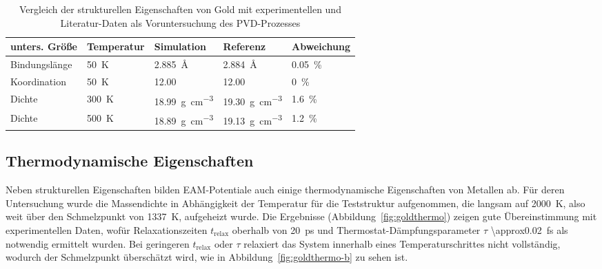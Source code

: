 \begin{table}
  \oddrowcolors
  \caption[Vergleich struktureller Eigenschaften von Gold]{
    Vergleich der strukturellen Eigenschaften von Gold mit experimentellen und Literatur-Daten als Voruntersuchung des PVD-Prozesses
  }
  \label{tab:goldpreresults}
  \begin{tabularx}{\textwidth}{|lXXXX|}
    \hline
    \textbf{unters. Größe} & \textbf{Temperatur} & \textbf{Simulation}                     & \textbf{Referenz}                       & \textbf{Abweichung} \\
    \hline
    Bindungslänge          & \SI{50}{\kelvin}    & \SI{2.885}{\angstrom}                   & \SI{2.884}{\angstrom}                   & \SI{0.05}{\percent} \\
    Koordination           & \SI{50}{\kelvin}    & \SI{12.00}{}                            & \SI{12.00}{}                            & \SI{0}{\percent}    \\
    Dichte                 & \SI{300}{\kelvin}   & \SI{18.99}{\gram\per\cubic\centi\meter} & \SI{19.30}{\gram\per\cubic\centi\meter} & \SI{1.6}{\percent}  \\
    Dichte                 & \SI{500}{\kelvin}   & \SI{18.89}{\gram\per\cubic\centi\meter} & \SI{19.13}{\gram\per\cubic\centi\meter} & \SI{1.2}{\percent}  \\
    \hline
  \end{tabularx}
\end{table}


\subsection{Thermodynamische Eigenschaften}
\label{goldthermo}

Neben strukturellen Eigenschaften bilden EAM-Potentiale auch einige thermodynamische Eigenschaften von Metallen ab.
Für deren Untersuchung wurde die Massendichte in Abhängigkeit der Temperatur für die Teststruktur aufgenommen, die langsam auf \SI{2000}{\kelvin}, also weit über den Schmelzpunkt von \SI{1337}{\kelvin}, aufgeheizt wurde.
Die Ergebnisse (Abbildung~\ref{fig:goldthermo}) zeigen gute Übereinstimmung mit experimentellen Daten, wofür Relaxationszeiten $t_\text{relax}$ oberhalb von \SI{20}{\pico\second} und Thermostat-Dämpfungsparameter $\tau$ \SI{\approx0.02}{\femto\second} als notwendig ermittelt wurden.
Bei geringeren $t_\text{relax}$ oder $\tau$ relaxiert das System innerhalb eines Temperaturschrittes nicht vollständig, wodurch der Schmelzpunkt überschätzt wird, wie in Abbildung~\ref{fig:goldthermo-b} zu sehen ist.

